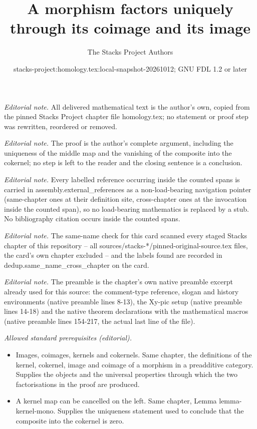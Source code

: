 \documentclass[10pt,a4paper]{amsart}
\title{A morphism factors uniquely through its coimage and its image}
\author{The Stacks Project Authors}
\date{stacks-project:homology.tex:local-snapshot-20261012; GNU FDL 1.2 or later}
\theoremstyle{plain}
\theoremstyle{definition}
\theoremstyle{remark}
\numberwithin{equation}{subsection}
\begin{document}
\maketitle
\noindent\textit{Editorial note.} All delivered mathematical text is the author's own, copied from the pinned Stacks Project chapter file homology.tex; no statement or proof step was rewritten, reordered or removed.\par\medskip
\noindent\textit{Editorial note.} The proof is the author's complete argument, including the uniqueness of the middle map and the vanishing of the composite into the cokernel; no step is left to the reader and the closing sentence is a conclusion.\par\medskip
\noindent\textit{Editorial note.} Every labelled reference occurring inside the counted spans is carried in assembly.external\_references as a non-load-bearing navigation pointer (same-chapter ones at their definition site, cross-chapter ones at the invocation inside the counted span), so no load-bearing mathematics is replaced by a stub. No bibliography citation occurs inside the counted spans.\par\medskip
\noindent\textit{Editorial note.} The same-name check for this card scanned every staged Stacks chapter of this repository -- all sources/stacks-*/pinned-original-source.tex files, the card's own chapter excluded -- and the labels found are recorded in dedup.same\_name\_cross\_chapter on the card.\par\medskip
\noindent\textit{Editorial note.} The preamble is the chapter's own native preamble excerpt already used for this source: the comment-type reference, slogan and history environments (native preamble lines 8-13), the Xy-pic setup (native preamble lines 14-18) and the native theorem declarations with the mathematical macros (native preamble lines 154-217, the actual last line of the file).\par\medskip
\noindent\textit{Allowed standard prerequisites (editorial).}\begin{itemize}
\item Images, coimages, kernels and cokernels. Same chapter, the definitions of the kernel, cokernel, image and coimage of a morphism in a preadditive category. Supplies the objects and the universal properties through which the two factorisations in the proof are produced.
\item A kernel map can be cancelled on the left. Same chapter, Lemma lemma-kernel-mono. Supplies the uniqueness statement used to conclude that the composite into the cokernel is zero.
\end{itemize}\medskip
\end{document}
